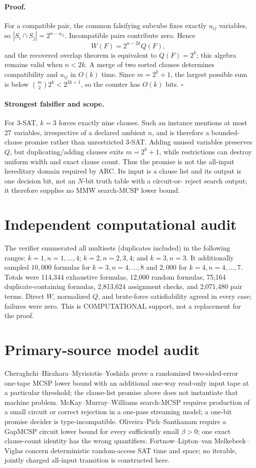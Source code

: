 \documentclass[11pt]{article}
\begin{document}
\paragraph{Proof.}
For a compatible pair, the common falsifying subcube fixes exactly $u_{ij}$
variables, so $|S_i\cap S_j|=2^{n-u_{ij}}$.  Incompatible pairs contribute
zero.  Hence
\[
 W(F)=2^{n-2k}Q(F),
\]
and the recovered overlap theorem is equivalent to $Q(F)=2^k$; this algebra
remains valid when $n<2k$.  A merge of two sorted clauses determines
compatibility and $u_{ij}$ in $O(k)$ time.  Since
$m=2^k+1$, the largest possible sum is below
$\binom m2 2^k<2^{3k+1}$, so the counter has $O(k)$ bits. \hfill$\square$

\paragraph{Strongest falsifier and scope.}
For 3-SAT, $k=3$ forces exactly nine clauses.  Such an instance mentions at
most 27 variables, irrespective of a declared ambient $n$, and is therefore a
bounded-clause promise rather than unrestricted 3-SAT.  Adding unused variables
preserves $Q$, but duplicating/adding clauses exits $m=2^k+1$, while restrictions
can destroy uniform width and exact clause count.  Thus the promise is not the
all-input hereditary domain required by ARC.  Its input is a clause list and
its output is one decision bit, not an $N$-bit truth table with a circuit-or-
reject search output; it therefore supplies no MMW search-MCSP lower bound.

\section{Independent computational audit}
The verifier enumerated all multisets (duplicates included) in the following
ranges: $k=1,n=1,\ldots,4$; $k=2,n=2,3,4$; and $k=3,n=3$.  It additionally
sampled $10{,}000$ formulas for $k=3,n=4,\ldots,8$ and $2{,}000$ for
$k=4,n=4,\ldots,7$.  Totals were 114,344 exhaustive formulas, 12,000 random
formulas, 75,164 duplicate-containing formulas, 2,813,624 assignment checks,
and 2,071,480 pair terms.  Direct $W$, normalized $Q$, and brute-force
satisfiability agreed in every case; failures were zero.  This is
COMPUTATIONAL support, not a replacement for the proof.

\section{Primary-source model audit}
Cheraghchi--Hirahara--Myrisiotis--Yoshida prove a randomized two-sided-error
one-tape MCSP lower bound with an additional one-way read-only input tape at a
particular threshold; the clause-list promise above does not instantiate that
machine problem.  McKay--Murray--Williams search-MCSP requires production of a
small circuit or correct rejection in a one-pass streaming model; a one-bit
promise decider is type-incompatible.  Oliveira--Pich--Santhanam require a
GapMCSP circuit lower bound for every sufficiently small $\beta>0$; one exact
clause-count identity has the wrong quantifiers.  Fortnow--Lipton--van
Melkebeek--Viglas concern deterministic random-access SAT time and space; no
iterable, jointly charged all-input transition is constructed here.
\end{document}
